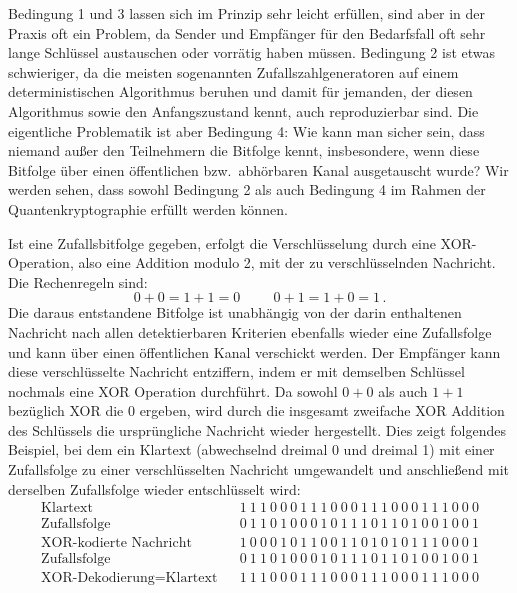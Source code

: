 Bedingung 1 und 3 lassen sich im Prinzip
sehr leicht erf\"ullen, sind aber in der Praxis oft ein Problem, da Sender
und Empf\"anger f\"ur den Bedarfsfall oft sehr lange Schl\"ussel austauschen oder vorr\"atig haben m\"ussen.  
Bedingung 2 ist etwas schwieriger, da die meisten
sogenannten Zufallszahlgeneratoren auf einem deterministischen Algorithmus beruhen und damit
f\"ur jemanden, der diesen Algorithmus sowie den Anfangszustand kennt, auch reproduzierbar sind. 
Die eigentliche Problematik ist aber Bedingung 4: Wie kann man sicher sein, dass niemand
au\ss er den Teilnehmern die Bitfolge kennt, insbesondere, wenn diese Bitfolge \"uber einen 
\"offentlichen bzw.\ abh\"orbaren Kanal ausgetauscht wurde? Wir werden sehen, dass sowohl Bedingung
2 als auch Bedingung 4 im Rahmen der Quantenkryptographie erf\"ullt werden k\"onnen. 

Ist eine Zufallsbitfolge gegeben, erfolgt die Verschl\"usselung durch eine XOR-Operation, also
eine Addition modulo 2, mit der zu verschl\"usselnden Nachricht. Die Rechenregeln sind:
\begin{equation}
     0+0=1+1=0 \hspace{1cm} 0+1=1+0=1 \, .
\end{equation} 
Die daraus entstandene Bitfolge ist unabh\"angig von der darin
enthaltenen Nachricht nach allen detektierbaren Kriterien ebenfalls wieder eine Zufallsfolge und kann
\"uber einen \"offentlichen Kanal verschickt werden. Der Empf\"anger kann diese verschl\"usselte Nachricht 
entziffern, indem er mit demselben Schl\"ussel nochmals eine XOR Operation durchf\"uhrt. Da sowohl
$0+0$ als auch $1+1$ bez\"uglich XOR die 0 ergeben, wird durch die insgesamt zweifache XOR
Addition des Schl\"ussels die urspr\"ungliche Nachricht wieder hergestellt. Dies zeigt folgendes Beispiel, bei dem
ein Klartext (abwechselnd dreimal 0 und dreimal 1)
mit einer Zufallsfolge zu einer verschl\"usselten Nachricht umgewandelt
und anschlie\ss end mit derselben Zufallsfolge wieder entschl\"usselt wird:
\begin{eqnarray}
\nonumber
  \mbox{Klartext} & &
  1~1~1~0~0~0~1~1~1~0~0~0~1~1~1~0~0~0~1~1~1~0~0~0 \\
  \nonumber
  \mbox{Zufallsfolge} & &
  0~1~1~0~1~0~0~0~1~0~1~1~1~0~1~1~0~1~0~0~1~0~0~1 \\
  \mbox{XOR-kodierte Nachricht} & &
  1~0~0~0~1~0~1~1~0~0~1~1~0~1~0~1~0~1~1~1~0~0~0~1 \\
\nonumber
  \mbox{Zufallsfolge} & &
  0~1~1~0~1~0~0~0~1~0~1~1~1~0~1~1~0~1~0~0~1~0~0~1 \\
\nonumber
 \mbox{XOR-Dekodierung=Klartext} & &
  1~1~1~0~0~0~1~1~1~0~0~0~1~1~1~0~0~0~1~1~1~0~0~0 
\end{eqnarray}

